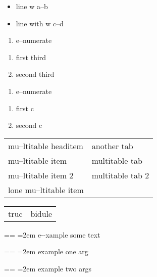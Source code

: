 \documentclass{book}
\makeatletter
\newenvironment{GNUTexinfopreformatted}{%
  \par\obeylines\obeyspaces\frenchspacing
  \parskip=\z@\parindent=\z@}{}
\makeatother
\begin{document}
\begin{titlepage}
\begin{itemize}[label=\hbox{} on a line]
\item line w a--b
\item line with w c--d
\end{itemize}

\begin{enumerate}[start=1]
\item e--numerate
\end{enumerate}

\begin{enumerate}[start=3]
\item first third
\item second third
\end{enumerate}

\begin{enumerate}[label=\alph*.]
\item e--numerate
\end{enumerate}

\begin{enumerate}[label=\alph*.,start=3]
\item first c
\item second c
\end{enumerate}

\begin{tabular}{m{} m{}}%
mu--ltitable headitem &another tab\\
mu--ltitable item &multitable tab\\
mu--ltitable item 2 &multitable tab 2
\index[cp]{index entry within multitable}%
\\
lone mu--ltitable item&\\
\end{tabular}%

\begin{tabular}{m{} m{}}%
truc &bidule\\
\end{tabular}%

\begin{GNUTexinfopreformatted}
\leftskip=2em\relax\ttfamily%
e{-}{-}xample  some
   text
\end{GNUTexinfopreformatted}

\begin{GNUTexinfopreformatted}
\leftskip=2em\relax\ttfamily%
example one arg
\end{GNUTexinfopreformatted}

\begin{GNUTexinfopreformatted}
\leftskip=2em\relax\ttfamily%
example two args
\end{GNUTexinfopreformatted}


\end{titlepage}
\end{document}
